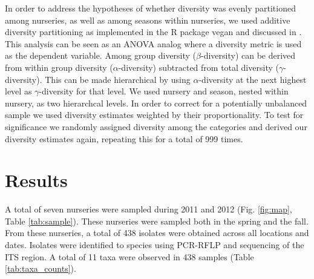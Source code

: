 \documentclass[12pt]{article}
\begin{document}
In order to address the hypotheses of whether diversity was evenly partitioned among nurseries, as well as among seasons within nurseries, we used additive diversity partitioning as implemented in the R package vegan \cite{vegan} and discussed in \cite{lande_1996, christ_etal_2003}.  This analysis can be seen as an ANOVA analog where a diversity metric is used as the dependent variable.  Among group diversity ($\beta$-diversity) can be derived from within group diversity ($\alpha$-diversity) subtracted from total diversity ($\gamma$-diversity).  This can be made hierarchical by using $\alpha$-diversity at the next highest level as $\gamma$-diversity for that level.  We used nursery and season, nested within nursery, as two hierarchcal levels.  In order to correct for a potentially unbalanced sample we used diversity estimates weighted by their proportionality.  To test for significance we randomly assigned diversity among the categories and derived our diversity estimates again, repeating this for a total of 999 times.


\section*{\sffamily\normalsize{Results}}


A total of seven nurseries were sampled during 2011 and 2012 (Fig. \ref{fig:map}, Table \ref{tab:sample}).  These nurseries were sampled both in the spring and the fall.  From these nurseries, a total of 438 isolates were obtained across all locations and dates.  Isolates were identified to species using PCR-RFLP and sequencing of the ITS region. A total of 11 taxa were observed in 438 samples (Table \ref{tab:taxa_counts}).
\end{document}
